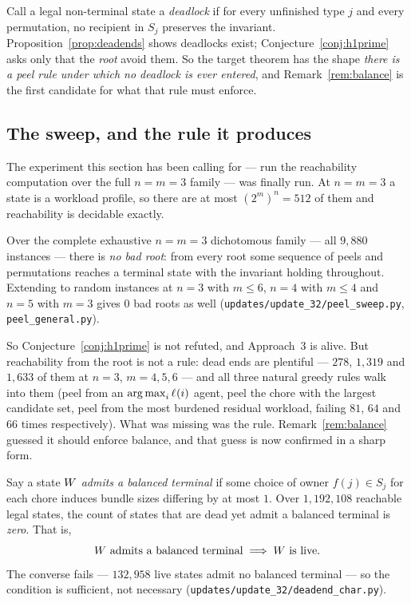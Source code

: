 Call a legal non-terminal state a \emph{deadlock} if for every unfinished type
$j$ and every permutation, no recipient in $S_j$ preserves the invariant.
Proposition~\ref{prop:deadends} shows deadlocks exist;
Conjecture~\ref{conj:h1prime} asks only that the \emph{root} avoid them. So the
target theorem has the shape \emph{there is a peel rule under which no deadlock
is ever entered}, and Remark~\ref{rem:balance} is the first candidate for what
that rule must enforce.

\subsection{The sweep, and the rule it produces}
\label{sec:peelsweep-done}

The experiment this section has been calling for --- run the reachability
computation over the full $n = m = 3$ family --- was finally run. At $n = m = 3$ a
state is a workload profile, so there are at most $(2^m)^n = 512$ of them and
reachability is decidable exactly.

\begin{observation}
\label{obs:peel-sweep}
Over the complete exhaustive $n = m = 3$ dichotomous family --- all $9{,}880$
instances --- there is \emph{no bad root}: from every root some sequence of peels
and permutations reaches a terminal state with the invariant holding throughout.
Extending to random instances at $n = 3$ with $m \le 6$, $n = 4$ with $m \le 4$
and $n = 5$ with $m = 3$ gives $0$ bad roots as well
(\texttt{updates/update\_32/peel\_sweep.py}, \texttt{peel\_general.py}).
\end{observation}

So Conjecture~\ref{conj:h1prime} is not refuted, and Approach~3 is alive. But
reachability from the root is not a rule: dead ends are plentiful --- $278$,
$1{,}319$ and $1{,}633$ of them at $n=3$, $m = 4,5,6$ --- and all three natural
greedy rules walk into them (peel from an $\operatorname*{arg\,max}_i \ell_{}(i)$ agent, peel the
chore with the largest candidate set, peel from the most burdened residual
workload, failing $81$, $64$ and $66$ times respectively). What was missing was
the rule. Remark~\ref{rem:balance} guessed it should enforce balance, and that
guess is now confirmed in a sharp form.

\begin{observation}
\label{obs:balance-characterises}
Say a state $W$ \emph{admits a balanced terminal} if some choice of
owner $f(j) \in S_j$ for each chore induces bundle sizes differing by at most
$1$. Over $1{,}192{,}108$ reachable legal states, the count of states that are
dead yet admit a balanced terminal is \emph{zero}. That is,
\[
  \text{$W$ admits a balanced terminal} \;\Longrightarrow\;
  \text{$W$ is live.}
\]
The converse fails --- $132{,}958$ live states admit no balanced terminal --- so
the condition is sufficient, not necessary
(\texttt{updates/update\_32/deadend\_char.py}).
\end{observation}


